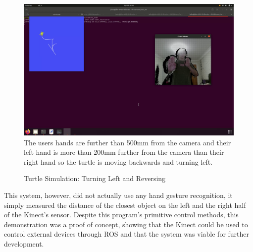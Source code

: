 \begin{figure}[!htb]
    \caption{Turtle Simulation: Turning Left and Reversing}
    \includegraphics[width=\textwidth]{Gesture Control Demo Turning.png}
    \small
    The users hands are further than 500mm from the camera and their left hand is more than 200mm further from the camera than their right hand so the turtle is moving backwards and turning left.
    \label{fig:turtle_turn}
\end{figure}

This system, however, did not actually use any hand gesture recognition, it simply measured the distance of the closest object on the left and the right half of the Kinect's sensor.
Despite this program's primitive control methods, this demonstration was a proof of concept, showing that the Kinect could be used to control external devices through ROS and that the system was viable for further development.